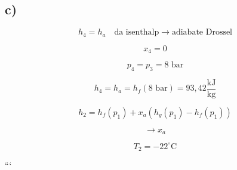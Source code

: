 

\subsection*{c)}

\[
h_4 = h_a \quad \text{da isenthalp} \rightarrow \text{adiabate Drossel}
\]

\[
x_4 = 0
\]

\[
p_4 = p_3 = 8 \text{ bar}
\]

\[
h_4 = h_a = h_f (8 \text{ bar}) = 93,42 \frac{\text{kJ}}{\text{kg}}
\]

\[
h_2 = h_f (p_1) + x_a (h_g (p_1) - h_f (p_1))
\]

\[
\rightarrow x_a
\]

\[
T_2 = -22^\circ \text{C}
\]

```